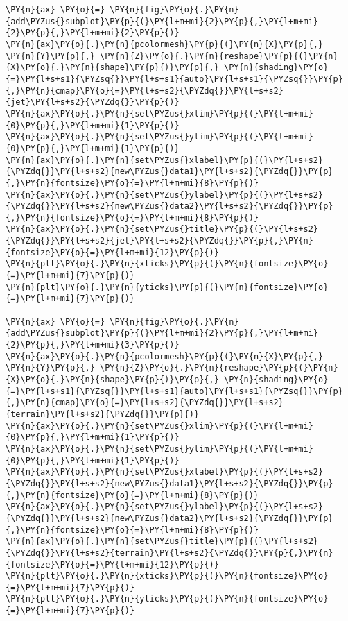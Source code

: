 \begin{tcolorbox}[breakable, size=fbox, boxrule=1pt, pad at break*=1mm,colback=cellbackground, colframe=cellborder]
\begin{Verbatim}[commandchars=\\\{\}]
\PY{n}{ax} \PY{o}{=} \PY{n}{fig}\PY{o}{.}\PY{n}{add\PYZus{}subplot}\PY{p}{(}\PY{l+m+mi}{2}\PY{p}{,}\PY{l+m+mi}{2}\PY{p}{,}\PY{l+m+mi}{2}\PY{p}{)}
\PY{n}{ax}\PY{o}{.}\PY{n}{pcolormesh}\PY{p}{(}\PY{n}{X}\PY{p}{,} \PY{n}{Y}\PY{p}{,} \PY{n}{Z}\PY{o}{.}\PY{n}{reshape}\PY{p}{(}\PY{n}{X}\PY{o}{.}\PY{n}{shape}\PY{p}{)}\PY{p}{,} \PY{n}{shading}\PY{o}{=}\PY{l+s+s1}{\PYZsq{}}\PY{l+s+s1}{auto}\PY{l+s+s1}{\PYZsq{}}\PY{p}{,}\PY{n}{cmap}\PY{o}{=}\PY{l+s+s2}{\PYZdq{}}\PY{l+s+s2}{jet}\PY{l+s+s2}{\PYZdq{}}\PY{p}{)}
\PY{n}{ax}\PY{o}{.}\PY{n}{set\PYZus{}xlim}\PY{p}{(}\PY{l+m+mi}{0}\PY{p}{,}\PY{l+m+mi}{1}\PY{p}{)}
\PY{n}{ax}\PY{o}{.}\PY{n}{set\PYZus{}ylim}\PY{p}{(}\PY{l+m+mi}{0}\PY{p}{,}\PY{l+m+mi}{1}\PY{p}{)}
\PY{n}{ax}\PY{o}{.}\PY{n}{set\PYZus{}xlabel}\PY{p}{(}\PY{l+s+s2}{\PYZdq{}}\PY{l+s+s2}{new\PYZus{}data1}\PY{l+s+s2}{\PYZdq{}}\PY{p}{,}\PY{n}{fontsize}\PY{o}{=}\PY{l+m+mi}{8}\PY{p}{)}
\PY{n}{ax}\PY{o}{.}\PY{n}{set\PYZus{}ylabel}\PY{p}{(}\PY{l+s+s2}{\PYZdq{}}\PY{l+s+s2}{new\PYZus{}data2}\PY{l+s+s2}{\PYZdq{}}\PY{p}{,}\PY{n}{fontsize}\PY{o}{=}\PY{l+m+mi}{8}\PY{p}{)}
\PY{n}{ax}\PY{o}{.}\PY{n}{set\PYZus{}title}\PY{p}{(}\PY{l+s+s2}{\PYZdq{}}\PY{l+s+s2}{jet}\PY{l+s+s2}{\PYZdq{}}\PY{p}{,}\PY{n}{fontsize}\PY{o}{=}\PY{l+m+mi}{12}\PY{p}{)}
\PY{n}{plt}\PY{o}{.}\PY{n}{xticks}\PY{p}{(}\PY{n}{fontsize}\PY{o}{=}\PY{l+m+mi}{7}\PY{p}{)}
\PY{n}{plt}\PY{o}{.}\PY{n}{yticks}\PY{p}{(}\PY{n}{fontsize}\PY{o}{=}\PY{l+m+mi}{7}\PY{p}{)}

\PY{n}{ax} \PY{o}{=} \PY{n}{fig}\PY{o}{.}\PY{n}{add\PYZus{}subplot}\PY{p}{(}\PY{l+m+mi}{2}\PY{p}{,}\PY{l+m+mi}{2}\PY{p}{,}\PY{l+m+mi}{3}\PY{p}{)}
\PY{n}{ax}\PY{o}{.}\PY{n}{pcolormesh}\PY{p}{(}\PY{n}{X}\PY{p}{,} \PY{n}{Y}\PY{p}{,} \PY{n}{Z}\PY{o}{.}\PY{n}{reshape}\PY{p}{(}\PY{n}{X}\PY{o}{.}\PY{n}{shape}\PY{p}{)}\PY{p}{,} \PY{n}{shading}\PY{o}{=}\PY{l+s+s1}{\PYZsq{}}\PY{l+s+s1}{auto}\PY{l+s+s1}{\PYZsq{}}\PY{p}{,}\PY{n}{cmap}\PY{o}{=}\PY{l+s+s2}{\PYZdq{}}\PY{l+s+s2}{terrain}\PY{l+s+s2}{\PYZdq{}}\PY{p}{)}
\PY{n}{ax}\PY{o}{.}\PY{n}{set\PYZus{}xlim}\PY{p}{(}\PY{l+m+mi}{0}\PY{p}{,}\PY{l+m+mi}{1}\PY{p}{)}
\PY{n}{ax}\PY{o}{.}\PY{n}{set\PYZus{}ylim}\PY{p}{(}\PY{l+m+mi}{0}\PY{p}{,}\PY{l+m+mi}{1}\PY{p}{)}
\PY{n}{ax}\PY{o}{.}\PY{n}{set\PYZus{}xlabel}\PY{p}{(}\PY{l+s+s2}{\PYZdq{}}\PY{l+s+s2}{new\PYZus{}data1}\PY{l+s+s2}{\PYZdq{}}\PY{p}{,}\PY{n}{fontsize}\PY{o}{=}\PY{l+m+mi}{8}\PY{p}{)}
\PY{n}{ax}\PY{o}{.}\PY{n}{set\PYZus{}ylabel}\PY{p}{(}\PY{l+s+s2}{\PYZdq{}}\PY{l+s+s2}{new\PYZus{}data2}\PY{l+s+s2}{\PYZdq{}}\PY{p}{,}\PY{n}{fontsize}\PY{o}{=}\PY{l+m+mi}{8}\PY{p}{)}
\PY{n}{ax}\PY{o}{.}\PY{n}{set\PYZus{}title}\PY{p}{(}\PY{l+s+s2}{\PYZdq{}}\PY{l+s+s2}{terrain}\PY{l+s+s2}{\PYZdq{}}\PY{p}{,}\PY{n}{fontsize}\PY{o}{=}\PY{l+m+mi}{12}\PY{p}{)}
\PY{n}{plt}\PY{o}{.}\PY{n}{xticks}\PY{p}{(}\PY{n}{fontsize}\PY{o}{=}\PY{l+m+mi}{7}\PY{p}{)}
\PY{n}{plt}\PY{o}{.}\PY{n}{yticks}\PY{p}{(}\PY{n}{fontsize}\PY{o}{=}\PY{l+m+mi}{7}\PY{p}{)}


\end{Verbatim}
\end{tcolorbox}

